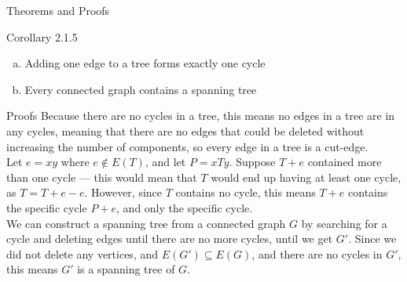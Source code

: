 \documentclass[10pt]{extarticle}
\begin{document}
\begin{problem}{Theorems and Proofs}
\begin{problem}{Corollary 2.1.5}
\begin{enumerate}[(a)]
      \item Adding one edge to a tree forms exactly one cycle
      \item Every connected graph contains a spanning tree
    \end{enumerate}
  \end{problem}
  \begin{problem}{Proofs}
    Because there are no cycles in a tree, this means no edges in a tree are in any cycles, meaning that there are no edges that could be deleted without increasing the number of components, so every edge in a tree is a cut-edge.\\

    Let $e = xy$ where $e\notin E(T)$, and let $P = xTy$. Suppose $T+e$ contained more than one cycle --- this would mean that $T$ would end up having at least one cycle, as $T = T+e-e$. However, since $T$ contains no cycle, this means $T+e$ contains the specific cycle $P+e$, and only the specific cycle.\\

    We can construct a spanning tree from a connected graph $G$ by searching for a cycle and deleting edges until there are no more cycles, until we get $G'$. Since we did not delete any vertices, and $E(G')\subseteq E(G)$, and there are no cycles in $G'$, this means $G'$ is a spanning tree of $G$.
  \end{problem}
\end{problem}
\end{document}
